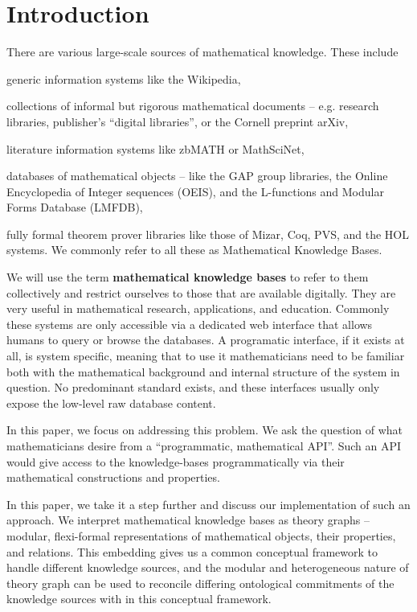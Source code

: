 \section{Introduction}\label{sec:intro}

There are various large-scale sources of mathematical knowledge.  These include
\begin{compactitem}
\item generic information systems like the Wikipedia,
\item collections of informal but rigorous mathematical documents -- e.g. research libraries, publisher's ``digital libraries'', or the Cornell preprint arXiv,
\item literature information systems like zbMATH or MathSciNet,
\item databases of mathematical objects -- like the GAP group libraries, the Online Encyclopedia of Integer sequences (OEIS), and the L-functions and Modular Forms Database (LMFDB),
\item fully formal theorem prover libraries like those of Mizar, Coq, PVS, and the HOL systems.  We commonly refer to all these as Mathematical Knowledge Bases.
\end{compactitem}
  
We will use the term \textbf{mathematical knowledge bases} to refer to them collectively and restrict ourselves to those that are available digitally. They are very useful in mathematical research, applications, and education.  Commonly these systems are only accessible via a dedicated web interface that allows humans to query or browse the databases.  A programatic interface, if it exists at all, is system specific, meaning that to use it mathematicians need to be familiar both with the mathematical background and internal structure of the system in question.  No predominant standard exists, and these interfaces usually only expose the low-level raw database content.

In this paper, we focus on addressing this problem. 
We ask the question of what mathematicians desire from a ``programmatic, mathematical API''. 
Such an API would give access to the knowledge-bases programmatically via their mathematical constructions and properties. 

In this paper, we take it a step further and discuss our implementation of such an approach.  We interpret mathematical knowledge bases as \ommt theory graphs -- modular, flexi-formal representations of mathematical objects, their properties, and relations. This embedding gives us a common conceptual framework to handle different knowledge sources, and the modular and heterogeneous nature of \ommt theory graph can be used to reconcile differing ontological commitments of the knowledge sources with in this conceptual framework.

